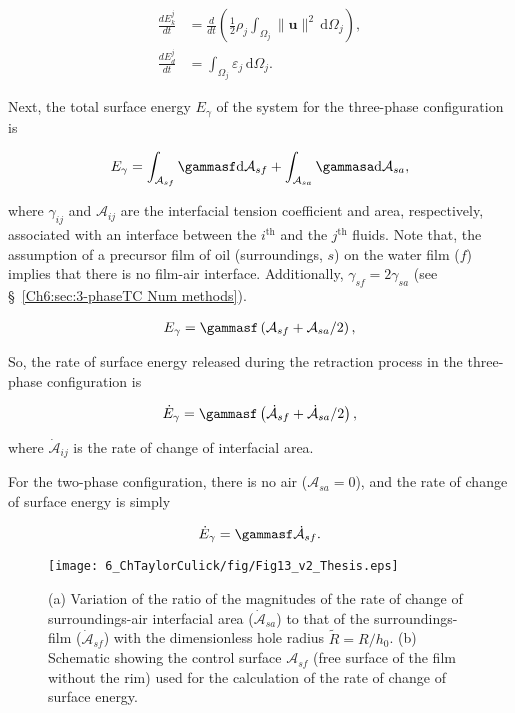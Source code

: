 \begin{subappendices}
	\begin{align}
		\label{Eqn::Ekt}
		\frac{dE_k^j}{dt} &= \frac{d}{dt}\left(\frac{1}{2}\rho_j\int_{\Omega_j}\|\boldsymbol{u}\|^2\,\mathrm{d}\Omega_j\right),\\
		\label{Eqn::Edt}
		\frac{dE_d^j}{dt} &= \int_{\Omega_j}\varepsilon_j\,\mathrm{d}\Omega_j.
	\end{align}
	
	Next, the total surface energy $E_\gamma$ of the system for the three-phase configuration is
	
	\begin{align}
		\label{Eqn::Es1}
		E_\gamma = \int_{\mathcal{A}_{sf}}\gammasf\mathrm{d}\mathcal{A}_{sf} + \int_{\mathcal{A}_{sa}}\gammasa\mathrm{d}\mathcal{A}_{sa},
	\end{align}
	
	\noindent where $\gamma_{ij}$ and $\mathcal{A}_{ij}$ are the interfacial tension coefficient and area, respectively, associated with an interface between the $i^{\text{th}}$ and the $j^{\text{th}}$ fluids. Note that, the assumption of a precursor film of oil (surroundings, $s$) on the water film ($f$) implies that there is no film-air interface. Additionally, $\gamma_{sf} = 2\gamma_{sa}$ (see \S~\ref{Ch6:sec:3-phaseTC Num methods}). 
	
	\begin{align}
		\label{Eqn::Es2}
		E_\gamma = \gammasf\left(\mathcal{A}_{sf} + \mathcal{A}_{sa}/2\right),
	\end{align}
	
	\noindent So, the rate of surface energy released during the retraction process in the three-phase configuration is
	
	\begin{align}
		\label{Eqn::Est1}
		\dot{E}_\gamma = \gammasf\left(\dot{\mathcal{A}}_{sf} + \dot{\mathcal{A}}_{sa}/2\right),
	\end{align}
	
	\noindent where $\dot{\mathcal{A}}_{ij}$ is the rate of change of interfacial area. 
	
	For the two-phase configuration, there is no air ($\mathcal{A}_{sa} = 0$), and the rate of change of surface energy is simply
	
	\begin{align}
		\label{Eqn::Est2}
		\dot{E}_\gamma = \gammasf\dot{\mathcal{A}}_{sf}.
	\end{align}
	
	\begin{figure}
		\centering
		\texttt{[image: 6\_ChTaylorCulick/fig/Fig13\_v2\_Thesis.eps]}	
		\caption{(a) Variation of the ratio of the magnitudes of the rate of change of surroundings-air interfacial area ($\dot{\mathcal{A}}_{sa}$) to that of the surroundings-film ($\dot{\mathcal{A}}_{sf}$) with the dimensionless hole radius $\tilde{R} = R/h_0$. (b) Schematic showing the control surface $\mathcal{A}_{sf}$ (free surface of the film without the rim) used for the calculation of the rate of change of surface energy.}
		\label{fig:AreaRateRatio}
	\end{figure}
	

\end{subappendices}
